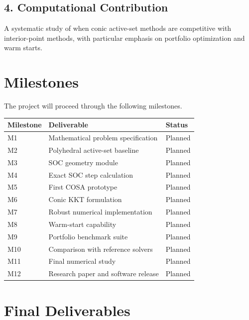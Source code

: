 \documentclass[11pt,a4paper]{article}
\begin{document}
\subsection{4. Computational Contribution}

A systematic study of when conic active-set methods are competitive
with interior-point methods, with particular emphasis on portfolio
optimization and warm starts.

\section{Milestones}

The project will proceed through the following milestones.

\begin{center}
\begin{tabular}{lll}
\toprule
Milestone & Deliverable & Status \\
\midrule
M1 & Mathematical problem specification & Planned \\
M2 & Polyhedral active-set baseline & Planned \\
M3 & SOC geometry module & Planned \\
M4 & Exact SOC step calculation & Planned \\
M5 & First COSA prototype & Planned \\
M6 & Conic KKT formulation & Planned \\
M7 & Robust numerical implementation & Planned \\
M8 & Warm-start capability & Planned \\
M9 & Portfolio benchmark suite & Planned \\
M10 & Comparison with reference solvers & Planned \\
M11 & Final numerical study & Planned \\
M12 & Research paper and software release & Planned \\
\bottomrule
\end{tabular}
\end{center}

\section{Final Deliverables}
\end{document}
